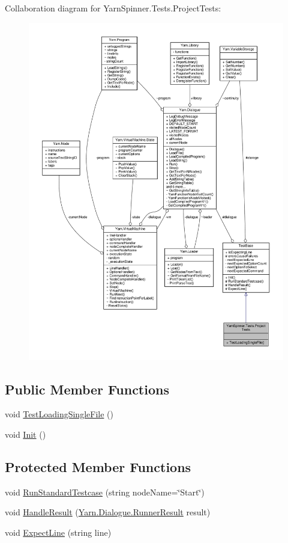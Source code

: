 Collaboration diagram for Yarn\-Spinner.\-Tests.\-Project\-Tests\-:
\nopagebreak
\begin{figure}[H]
\begin{center}
\leavevmode
\includegraphics[width=350pt]{da/df7/a00739}
\end{center}
\end{figure}
\subsection*{Public Member Functions}
\begin{DoxyCompactItemize}
\item 
void \hyperlink{a00130_a7d3dccb3f5ddf0b24e65782b7af15369}{Test\-Loading\-Single\-File} ()
\item 
void \hyperlink{a00146_a357a0dab579f9e45666c10779683dc27}{Init} ()
\end{DoxyCompactItemize}
\subsection*{Protected Member Functions}
\begin{DoxyCompactItemize}
\item 
void \hyperlink{a00146_abffa134d40d72b21e6b35c3bf05fc53f}{Run\-Standard\-Testcase} (string node\-Name=\char`\"{}Start\char`\"{})
\item 
void \hyperlink{a00146_a7b525f85a26d7c942e1cbfa5d6453893}{Handle\-Result} (\hyperlink{a00132}{Yarn.\-Dialogue.\-Runner\-Result} result)
\item 
void \hyperlink{a00146_ac21a5082ddac1da9db17ae54038df44e}{Expect\-Line} (string line)
\end{DoxyCompactItemize}
